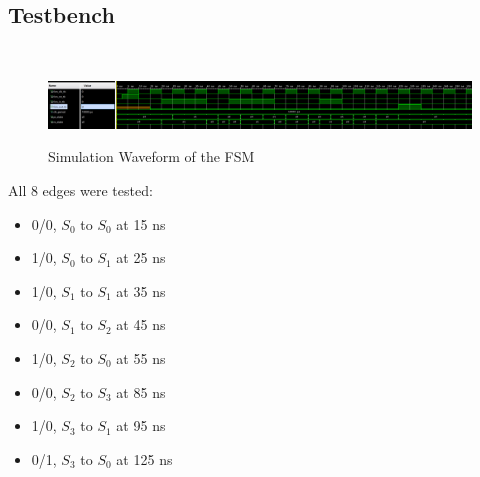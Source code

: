 \documentclass{article}
\begin{document}
\subsection*{Testbench}

\;\\
\begin{figure}[H]
  \centering
  \caption{Simulation Waveform of the FSM}
  \includegraphics[width=\textwidth]{ECE4304_Midterm2_5_sim.png}
  \label{fig:5_sim}
\end{figure}
All 8 edges were tested:
\begin{itemize}
  \item 0/0, $S_0$ to $S_0$ at 15 ns
  \item 1/0, $S_0$ to $S_1$ at 25 ns
  \item 1/0, $S_1$ to $S_1$ at 35 ns
  \item 0/0, $S_1$ to $S_2$ at 45 ns
  \item 1/0, $S_2$ to $S_0$ at 55 ns
  \item 0/0, $S_2$ to $S_3$ at 85 ns
  \item 1/0, $S_3$ to $S_1$ at 95 ns
  \item 0/1, $S_3$ to $S_0$ at 125 ns
\end{itemize}
\end{document}
